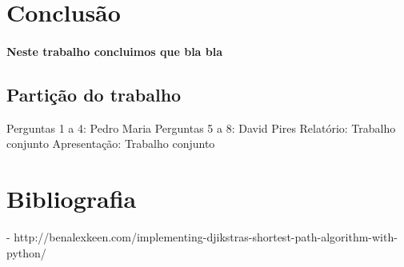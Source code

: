 \documentclass{article}
\begin{document}
\newpage
\section{Conclusão}

\paragraph{Neste trabalho concluimos que bla bla }

\subsection{Partição do trabalho}

Perguntas 1 a 4: Pedro Maria
\newline Perguntas 5 a 8: David Pires
\newline Relatório: Trabalho conjunto
\newline Apresentação: Trabalho conjunto

\section{Bibliografia}

- http://benalexkeen.com/implementing-djikstras-shortest-path-algorithm-with-python/
\end{document}
